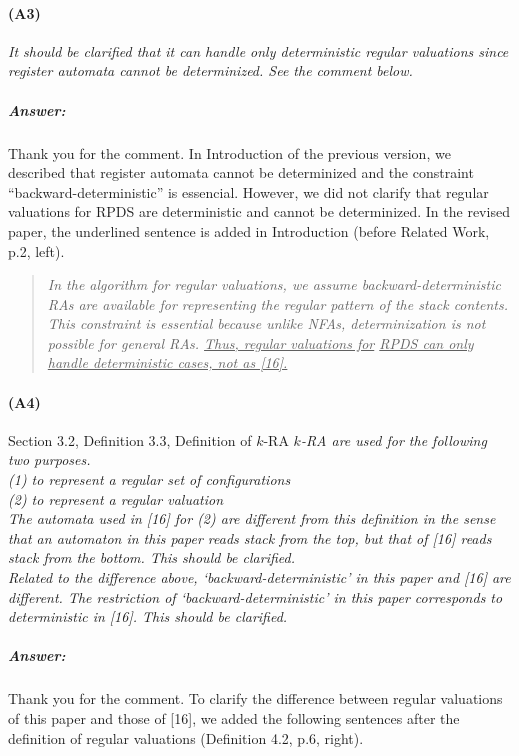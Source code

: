 \documentclass{article}
\begin{document}
\paragraph{(A3)}
\textit{
It should be clarified that it can handle only deterministic
regular valuations since register automata cannot be determinized. See the comment below.
}
\subparagraph{Answer:}
Thank you for the comment.
In Introduction of the previous version, we described that register automata cannot be determinized and the constraint ``backward-deterministic'' is essencial.
However, we did not clarify that regular valuations for RPDS are deterministic and cannot be determinized.
In the revised paper, the underlined sentence is added in Introduction (before Related Work, p.2, left).

\begin{quote}\em
	In the algorithm for regular valuations,
we assume backward-deterministic RAs are available for representing the regular pattern of the stack contents.
This constraint is essential because unlike NFAs, determinization is not possible for general RAs.
	\underline{Thus, regular valuations for}
      \underline{RPDS can only handle deterministic cases, not as [16].}
\end{quote}

\paragraph{(A4)} Section 3.2, Definition 3.3, Definition of $k$-RA \newline
\textit{
$k$-RA are used for the following two purposes.
\medskip\noindent\\
(1) to represent a regular set of configurations\\
(2) to represent a regular valuation
\medskip\noindent\\
The automata used in [16] for (2) are different from this definition in the sense that an
automaton in this paper reads stack from the top, but that of [16] reads stack from the
bottom. This should be clarified.
\medskip\noindent\\
Related to the difference above, `backward-deterministic' in this paper and [16] are different.
The restriction of `backward-deterministic' in this paper corresponds to deterministic in [16].
This should be clarified.
}
\subparagraph{Answer:}
Thank you for the comment.
To clarify the difference between regular valuations of this paper and
those of [16], we added the following sentences after the definition of regular valuations (Definition 4.2, p.6, right).
\end{document}
